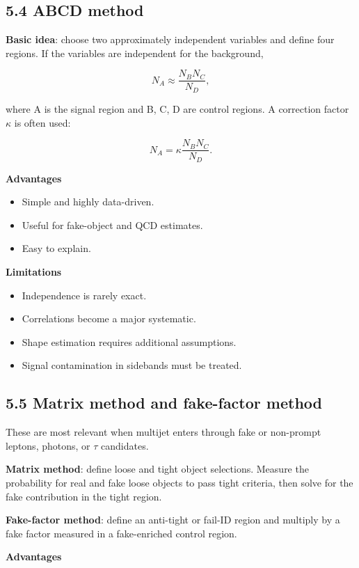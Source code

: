 \documentclass[11pt]{article}
\begin{document}
\subsection{5.4 ABCD method}

\textbf{Basic idea}: choose two approximately independent variables and define four regions. If the variables are independent for the background,

\[
N_A \approx \frac{N_B N_C}{N_D},
\]

where A is the signal region and B, C, D are control regions. A correction factor \(\kappa\) is often used:

\[
N_A = \kappa \frac{N_B N_C}{N_D}.
\]

\textbf{Advantages}

\begin{itemize}
\item Simple and highly data-driven.
\item Useful for fake-object and QCD estimates.
\item Easy to explain.
\end{itemize}

\textbf{Limitations}

\begin{itemize}
\item Independence is rarely exact.
\item Correlations become a major systematic.
\item Shape estimation requires additional assumptions.
\item Signal contamination in sidebands must be treated.
\end{itemize}

\subsection{5.5 Matrix method and fake-factor method}

These are most relevant when multijet enters through fake or non-prompt leptons, photons, or $\tau$ candidates.

\textbf{Matrix method}: define loose and tight object selections. Measure the probability for real and fake loose objects to pass tight criteria, then solve for the fake contribution in the tight region.

\textbf{Fake-factor method}: define an anti-tight or fail-ID region and multiply by a fake factor measured in a fake-enriched control region.

\textbf{Advantages}
\end{document}
